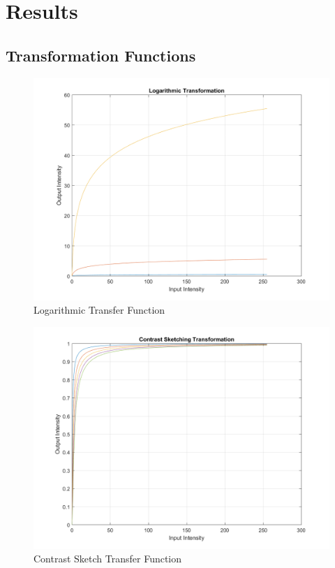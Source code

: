 \section{Results}

\subsection{Transformation Functions} 

\begin{figure}[H]
    \centering
    \includegraphics[scale=0.8]{logarithmic}
    \caption{Logarithmic Transfer Function}
\end{figure}

\begin{figure}[H]
    \centering
    \includegraphics[scale=0.8]{contrast_stretch}
    \caption{Contrast Sketch Transfer Function}
\end{figure}

